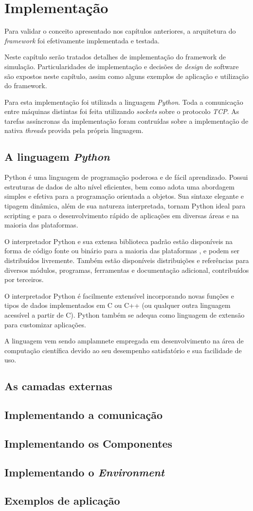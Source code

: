 \chapter{Implementação}

Para validar o conceito apresentado nos capítulos anteriores, a arquitetura do \textit{framework} foi efetivamente implementada e testada.

Neste capítulo serão tratados detalhes de implementação do framework de simulação. Particularidades de implementação e decisões de \textit{design} de software são expostos neste capítulo, assim como alguns exemplos de aplicação e utilização do framework.

Para esta implementação foi utilizada a linguagem \textit{Python}. Toda a comunicação entre máquinas distintas foi feita utilizando \textit{sockets} sobre o protocolo \textit{TCP}. As tarefas assíncronas da implementação foram contruídas sobre a implementação de nativa \textit{threads} provida pela própria linguagem.

\section{A linguagem \textit{Python}}

Python é uma linguagem de programação poderosa e de fácil aprendizado. Possui estruturas de dados de alto nível eficientes, bem como adota uma abordagem simples e efetiva para a programação orientada a objetos. Sua sintaxe elegante e tipagem dinâmica, além de sua natureza interpretada, tornam Python ideal para scripting e para o desenvolvimento rápido de aplicações em diversas áreas e na maioria das plataformas.

O interpretador Python e sua extensa biblioteca padrão estão disponíveis na forma de código fonte ou binário para a maioria das plataformas \cite{PYTHONSITE}, e podem ser distribuídos livremente. Também estão disponíveis distribuições e referências para diversos módulos, programas, ferramentas e documentação adicional, contribuídos por terceiros.

O interpretador Python é facilmente extensível incorporando novas funções e tipos de dados implementados em C ou C++ (ou qualquer outra linguagem acessível a partir de C). Python também se adequa como linguagem de extensão para customizar aplicações.

A linguagem vem sendo amplamnete empregada em desenvolvimento na área de computação científica devido ao seu desempenho satisfatório e sua facilidade de uso.

\section{As camadas externas}
\section{Implementando a comunicação}
\section{Implementando os Componentes}
\section{Implementando o \textit{Environment}}
\section{Exemplos de aplicação}
